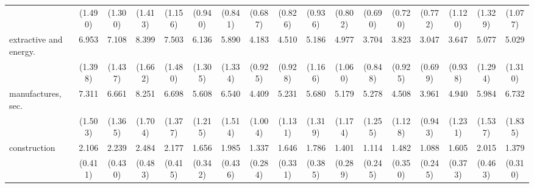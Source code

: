 {\begin{tabular}{l*{16}{c}}
                    &     (1.490)         &     (1.300)         &     (1.413)         &     (1.156)         &     (0.940)         &     (0.841)         &     (0.687)         &     (0.826)         &     (0.936)         &     (0.802)         &     (0.690)         &     (0.720)         &     (0.772)         &     (1.120)         &     (1.329)         &     (1.077)         \\
[1em]
extractive and energy.&       6.953\sym{***}&       7.108\sym{***}&       8.399\sym{***}&       7.503\sym{***}&       6.136\sym{***}&       5.890\sym{***}&       4.183\sym{***}&       4.510\sym{***}&       5.186\sym{***}&       4.977\sym{***}&       3.704\sym{***}&       3.823\sym{***}&       3.047\sym{***}&       3.647\sym{***}&       5.077\sym{***}&       5.029\sym{***}\\
                    &     (1.398)         &     (1.437)         &     (1.662)         &     (1.480)         &     (1.305)         &     (1.334)         &     (0.925)         &     (0.928)         &     (1.166)         &     (1.060)         &     (0.848)         &     (0.925)         &     (0.699)         &     (0.938)         &     (1.294)         &     (1.310)         \\
[1em]
manufactures, sec.  &       7.311\sym{***}&       6.661\sym{***}&       8.251\sym{***}&       6.698\sym{***}&       5.608\sym{***}&       6.540\sym{***}&       4.409\sym{***}&       5.231\sym{***}&       5.680\sym{***}&       5.179\sym{***}&       5.278\sym{***}&       4.508\sym{***}&       3.961\sym{***}&       4.940\sym{***}&       5.984\sym{***}&       6.732\sym{***}\\
                    &     (1.503)         &     (1.365)         &     (1.704)         &     (1.377)         &     (1.215)         &     (1.514)         &     (1.004)         &     (1.131)         &     (1.319)         &     (1.174)         &     (1.255)         &     (1.128)         &     (0.943)         &     (1.231)         &     (1.537)         &     (1.835)         \\
[1em]
construction        &       2.106\sym{***}&       2.239\sym{***}&       2.484\sym{***}&       2.177\sym{***}&       1.656\sym{*}  &       1.985\sym{**} &       1.337         &       1.646\sym{*}  &       1.786\sym{**} &       1.401         &       1.114         &       1.482         &       1.088         &       1.605\sym{*}  &       2.015\sym{**} &       1.379         \\
                    &     (0.411)         &     (0.430)         &     (0.483)         &     (0.415)         &     (0.342)         &     (0.436)         &     (0.284)         &     (0.331)         &     (0.385)         &     (0.289)         &     (0.245)         &     (0.350)         &     (0.245)         &     (0.373)         &     (0.463)         &     (0.310)         \\

\end{tabular}}
